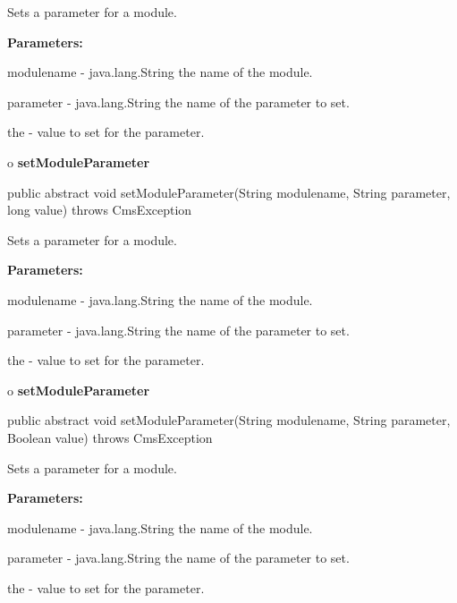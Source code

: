 \begin{description}
\htmlDD Sets a parameter for a module. 

\begin{description}
\item {\bf Parameters:}  

modulename - java.lang.String the name of the module.  

parameter - java.lang.String the name of the parameter to set.  

the - value to set for the parameter.  
\end{description}

\end{description}

o {\bf setModuleParameter} 

\begin{PRE}
 public abstract void setModuleParameter(String modulename,
                                         String parameter,
                                         long value) throws CmsException
\end{PRE}

\begin{description}
\htmlDD Sets a parameter for a module. 

\begin{description}
\item {\bf Parameters:}  

modulename - java.lang.String the name of the module.  

parameter - java.lang.String the name of the parameter to set.  

the - value to set for the parameter.  
\end{description}

\end{description}

o {\bf setModuleParameter} 

\begin{PRE}
 public abstract void setModuleParameter(String modulename,
                                         String parameter,
                                         Boolean value) throws CmsException
\end{PRE}

\begin{description}
\htmlDD Sets a parameter for a module. 

\begin{description}
\item {\bf Parameters:}  

modulename - java.lang.String the name of the module.  

parameter - java.lang.String the name of the parameter to set.  

the - value to set for the parameter.  
\end{description}

\end{description}

